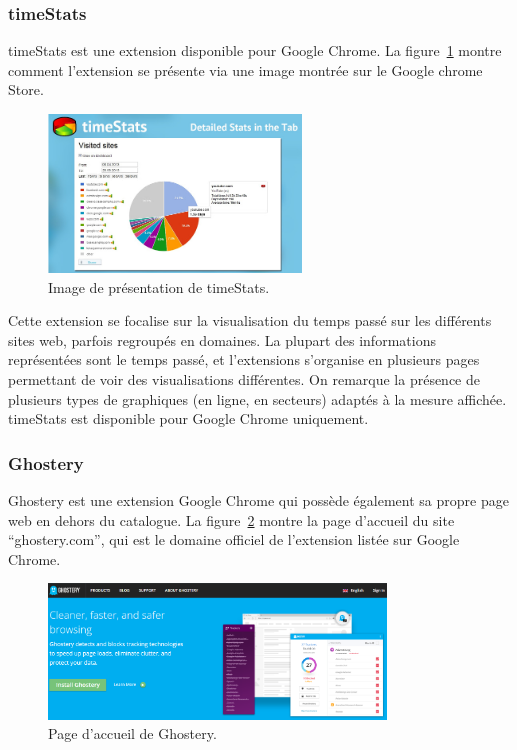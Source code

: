 		\subsubsection{timeStats}

			timeStats\cite{timestats} est une extension disponible pour Google Chrome. La figure~\ref{a-timestats} montre comment l'extension se présente via une image montrée sur le Google chrome Store.

			\begin{figure}[h]
				\centering
				\includegraphics[width=0.6\textwidth]{images/analysis/timestats}
				\caption{Image de présentation de timeStats\cite{timestats}.}
				\label{a-timestats}
			\end{figure}

			Cette extension se focalise sur la visualisation du temps passé sur les différents sites web, parfois regroupés en domaines. La plupart des informations représentées sont le temps passé, et l'extensions s'organise en plusieurs pages permettant de voir des visualisations différentes. On remarque la présence de plusieurs types de graphiques (en ligne, en secteurs) adaptés à la mesure affichée. timeStats est disponible pour Google Chrome uniquement.

		\subsubsection{Ghostery}

			Ghostery est une extension Google Chrome qui possède également sa propre page web en dehors du catalogue. La figure~\ref{a-ghostery} montre la page d'accueil du site ``ghostery.com'', qui est le domaine officiel de l'extension listée sur Google Chrome.

			\begin{figure}[h]
				\centering
				\includegraphics[width=0.8\textwidth]{images/analysis/ghostery}
				\caption{Page d'accueil de Ghostery\cite{ghostery}.}
				\label{a-ghostery}
			\end{figure}

